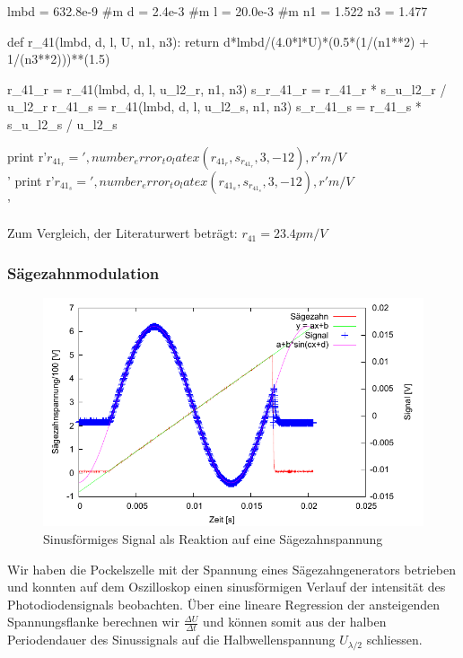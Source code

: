 \begin{python}
lmbd = 632.8e-9 #m
d = 2.4e-3 #m
l = 20.0e-3 #m
n1 = 1.522
n3 = 1.477

def r_41(lmbd, d, l, U, n1, n3):
  return d*lmbd/(4.0*l*U)*(0.5*(1/(n1**2) + 1/(n3**2)))**(1.5)

r_41_r = r_41(lmbd, d, l, u_l2_r, n1, n3)
s_r_41_r = r_41_r * s_u_l2_r / u_l2_r
r_41_s = r_41(lmbd, d, l, u_l2_s, n1, n3)
s_r_41_s = r_41_s * s_u_l2_s / u_l2_s

print r'$r_{41_r} = ', number_error_to_latex(r_41_r, s_r_41_r, 3, -12), r' m/V$\\'
print r'$r_{41_s} = ', number_error_to_latex(r_41_s, s_r_41_s, 3, -12), r' m/V$\\'


\end{python}

Zum Vergleich, der Literaturwert beträgt: $r_{41} = 23.4 pm/V$

\subsubsection{Sägezahnmodulation}

\begin{figure}[H]
 \centering
 \includegraphics{messwerte/saegezahn/saegezahn_1.pdf}
 \caption{Sinusförmiges Signal als Reaktion auf eine Sägezahnspannung}
\end{figure}

Wir haben die Pockelszelle mit der Spannung eines Sägezahngenerators betrieben und konnten auf dem Oszilloskop einen sinusförmigen Verlauf der intensität des Photodiodensignals beobachten. Über eine lineare Regression der ansteigenden Spannungsflanke berechnen wir $\frac{\Delta U}{\Delta t}$ und können somit aus der halben Periodendauer des Sinussignals auf die Halbwellenspannung $U_{\lambda/2}$ schliessen.


